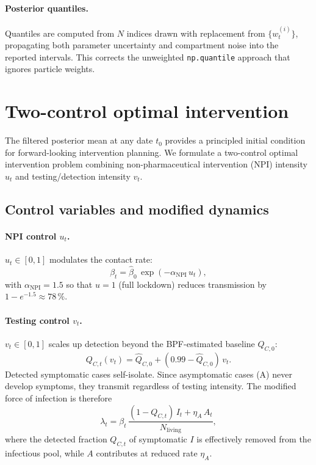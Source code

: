 \documentclass[11pt]{article}
\begin{document}
\paragraph{Posterior quantiles.}
Quantiles are computed from $N$ indices drawn with replacement from
$\{w_t^{(i)}\}$, propagating both parameter uncertainty and compartment
noise into the reported intervals.
This corrects the unweighted \texttt{np.quantile} approach that ignores
particle weights.


\section{Two-control optimal intervention}
\label{sec:control}

The filtered posterior mean at any date $t_0$ provides a principled
initial condition for forward-looking intervention planning.
We formulate a two-control optimal intervention problem combining
non-pharmaceutical intervention (NPI) intensity $u_t$ and
testing/detection intensity $v_t$.

\subsection{Control variables and modified dynamics}
\label{sec:ctrl_vars}

\paragraph{NPI control $u_t$.}
$u_t\in[0,1]$ modulates the contact rate:
\begin{equation}
  \beta_t = \hat\beta_0\,\exp(-\alpha_{\mathrm{NPI}}\,u_t),
  \label{eq:beta_ctrl}
\end{equation}
with $\alpha_{\mathrm{NPI}}=1.5$ so that $u=1$ (full lockdown) reduces
transmission by $1-e^{-1.5}\approx 78\,\%$.

\paragraph{Testing control $v_t$.}
$v_t\in[0,1]$ scales up detection beyond the BPF-estimated baseline
$\hat Q_{C,0}$:
\begin{equation}
  Q_{C,t}(v_t) = \hat Q_{C,0} + (0.99 - \hat Q_{C,0})\,v_t.
  \label{eq:qc_ctrl}
\end{equation}
Detected symptomatic cases self-isolate.  Since asymptomatic cases (A)
never develop symptoms, they transmit regardless of testing intensity.
The modified force of infection is therefore
\begin{equation}
  \lambda_t = \beta_t\,\frac{(1 - Q_{C,t})\,I_t + \eta_A\,A_t}
                            {N_{\mathrm{living}}},
  \label{eq:foi_ctrl}
\end{equation}
where the detected fraction $Q_{C,t}$ of symptomatic $I$ is effectively
removed from the infectious pool, while $A$ contributes at reduced rate
$\eta_A$.
\end{document}
